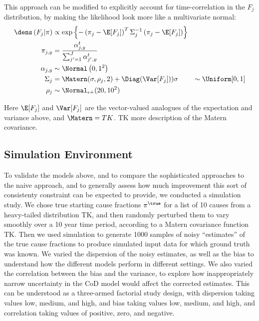  This approach can be modified to explicitly account for time-correlation in the
 $F_j$ distribution, by making the likelihood look more like a
 multivariate normal:
  \begin{align*}
    \dens\left(F_j | \pi \right)
    &\propto \exp\left\{-\left(\pi_j - \E[F_j]\right)^T \Sigma_j^{-1} \left(\pi_j - \E[F_j]\right) \right\}\\
    \pi_{j,y} &= \frac{\alpha_{j,y}^t}{\sum_{j'=1}^J \alpha_{j',y}^t}\\
    \alpha_{j,y} &\sim \Normal\left(0, 1^2\right)\\
    \Sigma_j &= \Matern(\sigma, \rho_j, 2) + \Diag(\Var[F_j]))
    \sigma &\sim \Uniform[0,1]\\
    \rho_j &\sim \Normal_{\epsilon+}(20, 10^2)
  \end{align*}

  Here $\E[F_j]$ and $\Var[F_j]$ are the vector-valued analogues of
  the expectation and variance above, and $\Matern = TK$. TK more
  description of the Matern covariance.


  \subsection*{Simulation Environment}
  To validate the models above, and to compare the sophisticated
  approaches to the naive approach, and to generally assess how much
  improvement this sort of consistenty constraint can be expected to
  provide, we conducted a simulation study.  We chose true starting
  cause fractions $\pi^\true$ for a list of 10 causes from a heavy-tailed
  distribution TK, and then randomly perturbed them to vary smoothly
  over a 10 year time period, according to a Matern covariance
  function TK.  Then we used simulation to generate 1000 samples of
  noisy ``estimates'' of the true cause fractions to produce simulated
  input data for which ground truth was known.  We varied the
  dispersion of the noisy estimates, as well as the bias to understand
  how the different models perform in different settings.  We also
  varied the correlation between the bias and the variance, to explore
  how inappropriately narrow uncertainty in the CoD model would affect
  the corrected estimates.  This can be understood as a three-armed
  factorial study design, with dispersion taking values low, medium,
  and high, and bias taking values low, medium, and high, and
  correlation taking values of positive, zero, and negative.

